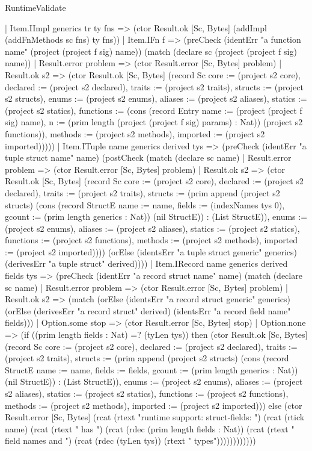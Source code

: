 \begin{lexlean}{RuntimeValidate}
\begin{semanticmodule}
{    | Item.IImpl generics tr ty fns => (ctor Result.ok [Sc, Bytes] (addImpl (addFnMethods sc fns) ty fns))
    | Item.IFn f => (preCheck (identErr "a function name" (project (project f sig) name)) (match (declare sc (project (project f sig) name))
      | Result.error problem => (ctor Result.error [Sc, Bytes] problem)
      | Result.ok s2 => (ctor Result.ok [Sc, Bytes] (record Sc {core := (project s2 core), declared := (project s2 declared), traits := (project s2 traits), structs := (project s2 structs), enums := (project s2 enums), aliases := (project s2 aliases), statics := (project s2 statics), functions := (cons (record Entry {name := (project (project f sig) name), n := (prim length (project (project f sig) params) : Nat)}) (project s2 functions)), methods := (project s2 methods), imported := (project s2 imported)}))))
    | Item.ITuple name generics derived tys => (preCheck (identErr "a tuple struct name" name) (postCheck (match (declare sc name)
      | Result.error problem => (ctor Result.error [Sc, Bytes] problem)
      | Result.ok s2 => (ctor Result.ok [Sc, Bytes] (record Sc {core := (project s2 core), declared := (project s2 declared), traits := (project s2 traits), structs := (prim append (project s2 structs) (cons (record StructE {name := name, fields := (indexNames tys 0), gcount := (prim length generics : Nat)}) (nil StructE)) : (List StructE)), enums := (project s2 enums), aliases := (project s2 aliases), statics := (project s2 statics), functions := (project s2 functions), methods := (project s2 methods), imported := (project s2 imported)}))) (orElse (identsErr "a tuple struct generic" generics) (derivesErr "a tuple struct" derived))))
    | Item.IRecord name generics derived fields tys => (preCheck (identErr "a record struct name" name) (match (declare sc name)
      | Result.error problem => (ctor Result.error [Sc, Bytes] problem)
      | Result.ok s2 => (match (orElse (identsErr "a record struct generic" generics) (orElse (derivesErr "a record struct" derived) (identsErr "a record field name" fields)))
        | Option.some stop => (ctor Result.error [Sc, Bytes] stop)
        | Option.none => (if ((prim length fields : Nat) =? (tyLen tys)) then (ctor Result.ok [Sc, Bytes] (record Sc {core := (project s2 core), declared := (project s2 declared), traits := (project s2 traits), structs := (prim append (project s2 structs) (cons (record StructE {name := name, fields := fields, gcount := (prim length generics : Nat)}) (nil StructE)) : (List StructE)), enums := (project s2 enums), aliases := (project s2 aliases), statics := (project s2 statics), functions := (project s2 functions), methods := (project s2 methods), imported := (project s2 imported)})) else (ctor Result.error [Sc, Bytes] (rcat (rtext "runtime support: struct-fields: ") (rcat (rtick name) (rcat (rtext " has ") (rcat (rdec (prim length fields : Nat)) (rcat (rtext " field names and ") (rcat (rdec (tyLen tys)) (rtext " types"))))))))))))
}
\end{semanticmodule}
\end{lexlean}
